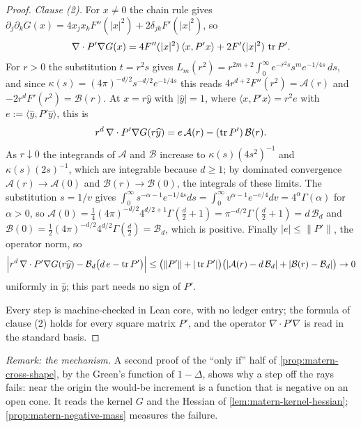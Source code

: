 \begin{proof}
\emph{Clause (2).} For $x \ne 0$ the chain rule gives
$\partial_j\partial_kG(x) = 4x_jx_kF''(|x|^2) + 2\delta_{jk}F'(|x|^2)$, so
\[
  \nabla\cdot P'\nabla G(x) = 4F''(|x|^2)\,\langle x,P'x\rangle + 2F'(|x|^2)\,\operatorname{tr} P' .
\]
For $r > 0$ the substitution $t = r^2s$ gives
$L_m(r^2) = r^{2m+2}\int_0^\infty e^{-r^2s}s^me^{-1/4s}\,ds$, and since
$\kappa(s) = (4\pi)^{-d/2}s^{-d/2}e^{-1/4s}$ this reads $4r^{d+2}F''(r^2) = \mathcal{A}(r)$ and
$-2r^dF'(r^2) = \mathcal{B}(r)$. At $x = r\widehat y$ with $|\widehat y| = 1$, where
$\langle x,P'x\rangle = r^2e$ with $e := \langle\widehat y,P'\widehat y\rangle$, this is
\[
  r^d\,\nabla\cdot P'\nabla G(r\widehat y) = e\,\mathcal{A}(r) - (\operatorname{tr} P')\,\mathcal{B}(r) .
\]
As $r \downarrow 0$ the integrands of $\mathcal{A}$ and $\mathcal{B}$ increase to
$\kappa(s)(4s^2)^{-1}$ and $\kappa(s)(2s)^{-1}$, which are integrable because $d \ge 1$; by dominated
convergence $\mathcal{A}(r) \to \mathcal{A}(0)$ and $\mathcal{B}(r) \to \mathcal{B}(0)$, the integrals of
these limits. The substitution $s = 1/v$ gives
$\int_0^\infty s^{-\alpha-1}e^{-1/4s}ds = \int_0^\infty v^{\alpha-1}e^{-v/4}dv = 4^\alpha\Gamma(\alpha)$
for $\alpha > 0$, so $\mathcal{A}(0) = \tfrac14(4\pi)^{-d/2}4^{d/2+1}\Gamma(\tfrac d2+1) =
\pi^{-d/2}\Gamma(\tfrac d2+1) = d\,\mathcal{B}_d$ and
$\mathcal{B}(0) = \tfrac12(4\pi)^{-d/2}4^{d/2}\Gamma(\tfrac d2) = \mathcal{B}_d$, which is positive.
Finally $|e| \le \|P'\|$, the operator norm, so
\[
  \Bigl| r^d\,\nabla\cdot P'\nabla G(r\widehat y) - \mathcal{B}_d\bigl(d\,e - \operatorname{tr} P'\bigr)\Bigr|
  \le \bigl(\|P'\| + |\operatorname{tr} P'|\bigr)\bigl(|\mathcal{A}(r) - d\,\mathcal{B}_d| + |\mathcal{B}(r) - \mathcal{B}_d|\bigr)
  \to 0
\]
uniformly in $\widehat y$; this part needs no sign of $P'$.

Every step is machine-checked in Lean core, with no ledger entry; the formula of clause (2) holds
for every square matrix $P'$, and the operator $\nabla\cdot P'\nabla$ is read in the standard basis.
\end{proof}

\emph{Remark: the mechanism.} A second proof of the ``only if'' half of
\ref{prop:matern-cross-shape}, by the Green's function of $1 - \Delta$, shows why a step off the rays
fails: near the origin the would-be increment is a function that is negative on an open cone. It
reads the kernel $G$ and the Hessian of \ref{lem:matern-kernel-hessian}; \ref{prop:matern-negative-mass}
measures the failure.

